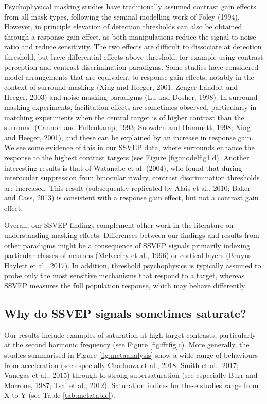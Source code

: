 \documentclass[]{article}
\begin{document}
Psychophysical masking studies have traditionally assumed contrast gain effects from all mask types, following the seminal modelling work of Foley (1994). However, in principle elevation of detection thresholds can also be obtained through a response gain effect, as both manipulations reduce the signal-to-noise ratio and reduce sensitivity. The two effects are difficult to dissociate at detection threshold, but have differential effects above threshold, for example using contrast perception and contrast discrimination paradigms. Some studies have considered model arrangements that are equivalent to response gain effects, notably in the context of surround masking (Xing and Heeger, 2001; Zenger-Landolt and Heeger, 2003) and noise masking paradigms (Lu and Dosher, 1998). In surround masking experiments, facilitation effects are sometimes observed, particularly in matching experiments when the central target is of higher contrast than the surround (Cannon and Fullenkamp, 1993; Snowden and Hammett, 1998; Xing and Heeger, 2001), and these can be explained by an increase in response gain. We see some evidence of this in our SSVEP data, where surrounds enhance the response to the highest contrast targets (see Figure \ref{fig:modelfig1}d). Another interesting results is that of Watanabe et al. (2004), who found that during interocular suppression from binocular rivalry, contrast discrimination thresholds are increased. This result (subsequently replicated by Alais et al., 2010; Baker and Cass, 2013) is consistent with a response gain effect, but not a contrast gain effect.

Overall, our SSVEP findings complement other work in the literature on understanding masking effects. Differences between our findings and results from other paradigms might be a consequence of SSVEP signals primarily indexing particular classes of neurons (McKeefry et al., 1996) or cortical layers (Bruyns-Haylett et al., 2017). In addition, threshold psychophysics is typically assumed to probe only the most sensitive mechanisms that respond to a target, whereas SSVEP measures the full population response, which may behave differently.

\hypertarget{why-do-ssvep-signals-sometimes-saturate}{%
\subsection{Why do SSVEP signals sometimes saturate?}\label{why-do-ssvep-signals-sometimes-saturate}}

Our results include examples of saturation at high target contrasts, particularly at the second harmonic frequency (see Figure \ref{fig:fftfig}c). More generally, the studies summarised in Figure \ref{fig:metaanalysis} show a wide range of behaviours from acceleration (see especially Chadnova et al., 2018; Smith et al., 2017; Vanegas et al., 2015) through to strong supersaturation (see especially Burr and Morrone, 1987; Tsai et al., 2012). Saturation indices for these studies range from X to Y (see Table \ref{tab:metatable}).
\end{document}
